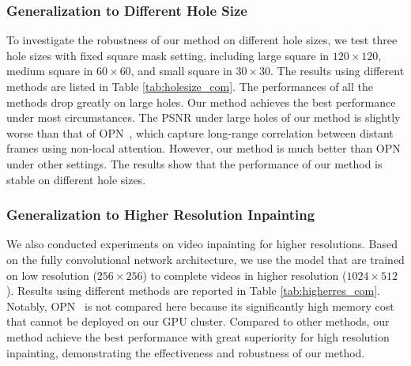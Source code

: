 \subsubsection{Generalization to Different Hole Size}
{\color{blue}	To investigate the robustness of our method on different hole sizes, we test three hole sizes with fixed square mask setting, including large square in $120\times120$, medium square in $60\times60$, and small square in $30\times30$. The results using different methods are listed in Table \ref{tab:holesize_com}. 
The performances of all the methods drop greatly on large holes. Our method achieves the best performance under most circumstances.
The PSNR under large holes of our method is slightly worse than that of OPN~\cite{oh2019onion}, which capture long-range correlation between distant frames using non-local attention. However, our method is much better than OPN under other settings. The results show that the performance of our method is stable on different hole sizes.

\subsubsection{Generalization to Higher Resolution Inpainting}
We also conducted experiments on video inpainting for higher resolutions. Based on the fully convolutional network architecture, we use the model that are trained on low resolution ($256\times256$) to complete videos in higher resolution ($1024\times512$). Results using different methods are reported in Table \ref{tab:higherres_com}. Notably, OPN~\cite{oh2019onion} is not compared here because its significantly high memory cost that cannot be deployed on our GPU cluster. 
Compared to other methods, our method achieve the best performance with great superiority for high resolution inpainting, demonstrating the effectiveness and robustness of our method.
}
 

